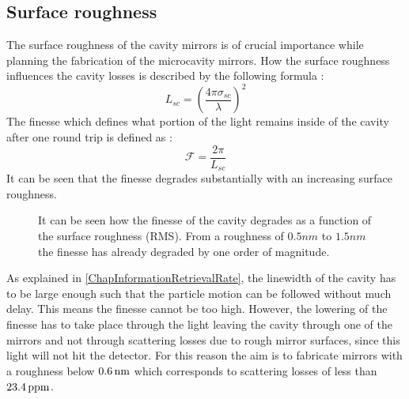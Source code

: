 \subsection{Surface roughness}
The surface roughness of the cavity mirrors is of crucial importance while planning the fabrication of the microcavity mirrors. How the surface roughness influences the cavity losses is described by the following formula \cite{roy2011fabrication}:
\begin{equation}
	L_{\si{sc}}=\left(\frac{4\pi\sigma_{\si{sc}}}{\lambda}\right)^2
\end{equation}
The finesse which defines what portion of the light remains inside of the cavity after one round trip is defined as \cite{roy2011fabrication}:
\begin{equation}
	\mathcal{F}=\frac{2\pi}{L_{\si{sc}}}
\end{equation}
It can be seen that the finesse degrades substantially with an increasing surface roughness.
\begin{figure}[H]
	
	\caption{It can be seen how the finesse of the cavity degrades as a function of the surface roughness (RMS). From a roughness of $0.5\si{nm}$ to $1.5\si{nm}$ the finesse has already degraded by one order of magnitude.}
\end{figure}
As explained in \autoref{ChapInformationRetrievalRate}, the linewidth of the cavity has to be large enough such that the particle motion can be followed without much delay. This means the finesse cannot be too high. However, the lowering of the finesse has to take place through the light leaving the cavity through one of the mirrors and not through scattering losses due to rough mirror surfaces, since this light will not hit the detector. For this reason the aim is to fabricate mirrors with a roughness below $0.6\nm$ which corresponds to scattering losses of less than $23.4\ppm$.

